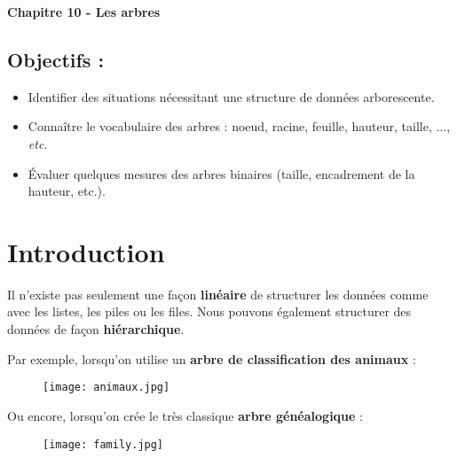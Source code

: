 \documentclass[french]{article}
\date{2023-2024}
\author{Tantely Rahobisoa}
\theoremstyle{plain}
\newcommand\gauchedroite[2]{\noindent{}#1\hfill#2}
\begin{document}
	
	
	\begin{tcolorbox}[colback=blue!5!white,colframe=black!75!black]
	\begin{center}
		\LARGE{\textbf{Chapitre 10 - Les arbres}}
	\end{center}
\end{tcolorbox}

\vspace{0.5cm}

\subsection*{Objectifs :}

\begin{itemize}[label=$\triangleright$]
	\item Identifier des situations nécessitant une structure de données arborescente.
	\item Connaître le vocabulaire des arbres : noeud, racine, feuille, hauteur, taille, ..., \textit{etc.}
	\item Évaluer quelques mesures des arbres binaires (taille, encadrement de la hauteur, etc.).
	
\end{itemize}


\section{Introduction}

Il n'existe pas seulement une façon \textbf{linéaire} de structurer les données comme avec les listes, les piles ou les files. Nous pouvons également structurer des données de façon \textbf{hiérarchique}. 

Par exemple, lorsqu'on utilise un \textbf{arbre de classification des animaux} :

	\begin{figure}[h]  %
	\centering
	\texttt{[image: animaux.jpg]}
	\end{figure}


Ou encore, lorsqu'on crée le très classique \textbf{arbre généalogique} :

	\begin{figure}[h]  %
	\centering
	\texttt{[image: family.jpg]}
	\end{figure}
\end{document}
